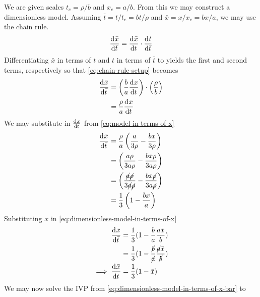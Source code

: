 \documentclass[12pt]{article}
\begin{document}
We are given scales $t_c=\rho/b$ and $x_c=a/b$. From this we may construct a
dimensionless model. Assuming $\bar{t}=t/t_c=bt/\rho$ and $\bar{x}=x/x_c=bx/a$, we may use
the chain rule.
\begin{equation}
  \label{eq:chain-rule-setup}
  \frac{\mathrm{d}^{} {\bar{x}}}{\mathrm{d}{\bar{t}}^{}} = \frac{\mathrm{d}^{} {\bar{x}}}{\mathrm{d}{t}^{}} \cdot \frac{\mathrm{d}^{} {t}}{\mathrm{d}{\bar{t}}^{}}
\end{equation}
Differentiating $\bar{x}$ in terms of $t$ and $t$ in terms of $\bar{t}$ to
yields the first and second terms, respectively so that
\cref{eq:chain-rule-setup} becomes
\begin{equation}
  \begin{aligned}
    \frac{\mathrm{d}^{} {\bar{x}}}{\mathrm{d}{\bar{t}}^{}} &= \left(\frac{b}{a}\frac{\mathrm{d}^{} {x}}{\mathrm{d}{t}^{}}\right)\cdot\left(\frac{\rho}{b}\right) \\
    &= \frac{\rho}{a}\frac{\mathrm{d}^{} {x}}{\mathrm{d}{t}^{}} \\
  \end{aligned}
\end{equation}
We may substitute in $\frac{\mathrm{d}^{} {x}}{\mathrm{d}{t}^{}}$ from \cref{eq:model-in-terms-of-x}
\begin{equation}
  \label{eq:dimensionless-model-in-terms-of-x}
  \begin{aligned}
    \frac{\mathrm{d}^{} {\bar{x}}}{\mathrm{d}{\bar{t}}^{}} &= \frac{\rho}{a}\left(\frac{a}{3\rho} -
    \frac{bx}{3\rho}\right) \\ &= \left(\frac{a\rho}{3a\rho} -
    \frac{bx\rho}{3a\rho}\right) \\
    &= \left(\frac{\cancel{a}\cancel{\rho}}{3\cancel{a}\cancel{\rho}} -
    \frac{bx\cancel{\rho}}{3a\cancel{\rho}}\right) \\
    &= \frac{1}{3}\left(1-\frac{bx}{a}\right) \\
  \end{aligned}
\end{equation}
Substituting $x$ in \cref{eq:dimensionless-model-in-terms-of-x}
\begin{equation}
  \label{eq:dimensionless-model-in-terms-of-x-bar}
  \begin{aligned}
    \frac{\mathrm{d}^{} {\bar{x}}}{\mathrm{d}{\bar{t}}^{}} &= \frac{1}{3}(1-\frac{b}{a}\frac{a\bar{x}}{b}) \\
    &=
    \frac{1}{3}(1-\frac{\cancel{b}}{\cancel{a}}\frac{\cancel{a}\bar{x}}{\cancel{b}})
    \\
    \implies \frac{\mathrm{d}^{} {\bar{x}}}{\mathrm{d}{\bar{t}}^{}} &= \frac{1}{3}(1-\bar{x}) \\
  \end{aligned}
\end{equation}
We may now solve the IVP from \cref{eq:dimensionless-model-in-terms-of-x-bar} to
\end{document}
